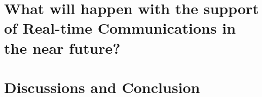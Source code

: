 \chapter{What will happen with the support of Real-time Communications in the near future?}




\chapter{Discussions and Conclusion}
